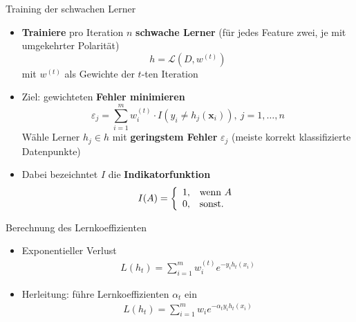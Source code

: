 \documentclass[hyperref={bookmarks=false},11pt,dvipsnames]{beamer}
\begin{document}
\begin{frame}[t]{Training der schwachen Lerner}
	\begin{itemize}
		\item <1-> \textbf{Trainiere} pro Iteration $n$ \textbf{schwache Lerner} (für jedes Feature zwei, je mit umgekehrter Polarität)
		      $$
			      h = \mathcal{L}(D, w^{(t)})
		      $$
		      mit $w^{(t)}$ als Gewichte der $t$-ten Iteration
		\item <2-> Ziel: gewichteten \textbf{Fehler minimieren}
		      $$
			      \varepsilon_j = \sum_{i=1}^m w_i^{(t)}\cdot I\left(y_i \neq h_j\left(\boldsymbol{x}_i\right)\right),~j=1,\dots,n
		      $$
		      Wähle Lerner $h_j\in h$ mit \textbf{geringstem Fehler} $\varepsilon_j$ (meiste korrekt klassifizierte Datenpunkte)
		\item <3-> Dabei bezeichntet $I$ die \textbf{Indikatorfunktion}
		      $$
			      I(A)=\left\{\begin{array}{l l}
				      1, & \text{wenn } A \\
				      0, & \text{sonst.}
			      \end{array}\right.
		      $$
	\end{itemize}
\end{frame}

\begin{frame}[t]{Berechnung des Lernkoeffizienten}
	\begin{itemize}
		\item <1-> Exponentieller Verlust \begin{align*}
			      L(h_t) = \sum_{i=1}^{m} w_i^{(t)}e^{-y_ih_t(x_i)}
		      \end{align*}
		\item <2-> Herleitung: führe Lernkoeffizienten $\alpha_t$ ein \begin{align*}
			      L(h_t)=\sum_{i=1}^{m}w_ie^{-\alpha_ty_ih_t(x_i)}
		      \end{align*}
	\end{itemize}
\end{frame}
\end{document}
